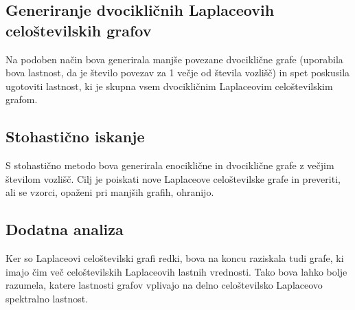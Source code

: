 \documentclass{article}
\begin{document}
\subsection{Generiranje dvocikličnih Laplaceovih celoštevilskih grafov}
Na podoben način bova generirala manjše povezane dvociklične grafe (uporabila bova lastnost, da je število povezav za 1 večje od števila vozlišč) in spet poskusila
ugotoviti lastnost, ki je skupna vsem dvocikličnim Laplaceovim celoštevilskim grafom. \\

\subsection{Stohastično iskanje}
S stohastično metodo bova generirala enociklične in dvociklične grafe z večjim številom vozlišč. 
Cilj je poiskati nove Laplaceove celoštevilske grafe in preveriti, ali se vzorci, opaženi pri manjših grafih, ohranijo.\\

\subsection{Dodatna analiza}
Ker so Laplaceovi celoštevilski grafi redki, bova na koncu raziskala tudi grafe, ki imajo čim več celoštevilskih Laplaceovih lastnih vrednosti. 
Tako bova lahko bolje razumela, katere lastnosti grafov vplivajo na delno celoštevilsko Laplaceovo spektralno lastnost.
\end{document}
